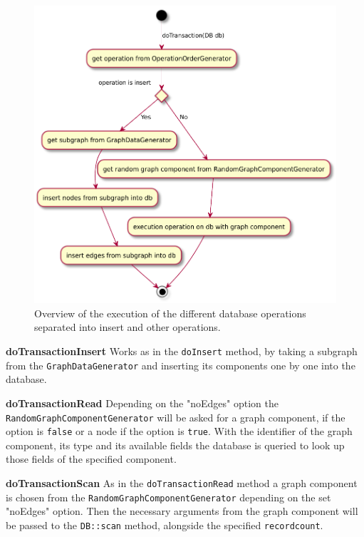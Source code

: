 \begin{figure}[h!]
  \includegraphics[width=\textwidth]{images/extensions/graphWorkloadExecution}
  \caption{Overview of the execution of the different database operations separated into insert and other operations.}
  \label{fig:graphWorkloadExecution}
\end{figure}

\textbf{doTransactionInsert} \newline
Works as in the \texttt{doInsert} method,
by taking a subgraph from the \texttt{GraphDataGenerator} and inserting its components one by one into the database.

\textbf{doTransactionRead} \newline
Depending on the "noEdges" option the \texttt{RandomGraphComponentGenerator} will be asked for a graph component,
if the option is \texttt{false} or a node if the option is \texttt{true}.
With the identifier of the graph component,
its type and its available fields the database is queried to look up those fields of the specified component.

\textbf{doTransactionScan} \newline
As in the \texttt{doTransactionRead} method a graph component is chosen from the \texttt{RandomGraphComponentGenerator} depending on the set "noEdges" option.
Then the necessary arguments from the graph component will be passed to the \texttt{DB::scan} method,
alongside the specified \texttt{recordcount}.

